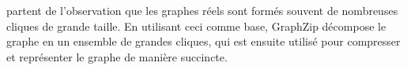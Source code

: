	
	\citep{rossi2018graphzip} partent de l'observation que les graphes réels sont formés souvent de nombreuses cliques de grande taille. En utilisant ceci comme base, GraphZip décompose le graphe en un ensemble de grandes cliques, qui est ensuite utilisé pour compresser et représenter le graphe de manière succincte. 
